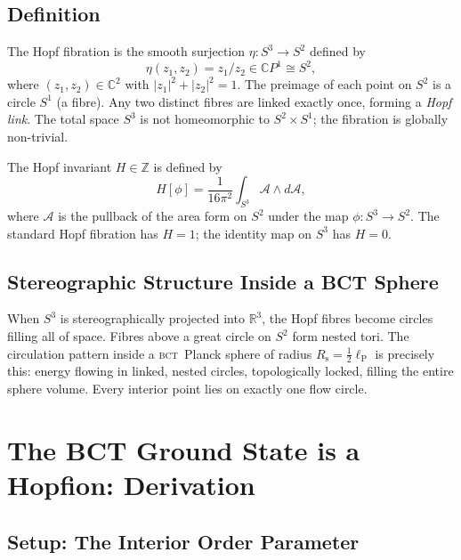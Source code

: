 \documentclass[aps,prl,preprint,superscriptaddress,floatfix]{revtex4-2}
\newcommand{\lP}{\ell_{\mathrm{P}}}
\newcommand{\BCT}{\textsc{bct}}
\newcommand{\Rsph}{R_{\mathrm{s}}}
\newcommand{\HopfN}{H}
\begin{document}
\subsection{Definition}

The Hopf fibration is the smooth surjection
$\eta: S^3\to S^2$ defined by
\begin{equation}
  \eta(z_1,z_2) = z_1/z_2 \in \mathbb{C}P^1 \cong S^2,
  \label{eq:hopf-map}
\end{equation}
where $(z_1,z_2)\in\mathbb{C}^2$ with $|z_1|^2+|z_2|^2=1$.
The preimage of each point on $S^2$ is a circle $S^1$ (a fibre).
Any two distinct fibres are linked exactly once, forming a \emph{Hopf link}.
The total space $S^3$ is not homeomorphic to $S^2\times S^1$; the
fibration is globally non-trivial.

The Hopf invariant $\HopfN\in\mathbb{Z}$ is defined by
\begin{equation}
  \HopfN[\phi] = \frac{1}{16\pi^2}
  \int_{S^3} \mathcal{A}\wedge d\mathcal{A},
  \label{eq:hopf-invariant}
\end{equation}
where $\mathcal{A}$ is the pullback of the area form on $S^2$ under the
map $\phi:S^3\to S^2$.
The standard Hopf fibration has $\HopfN=1$; the identity map on $S^3$
has $\HopfN=0$.

\subsection{Stereographic Structure Inside a BCT Sphere}

When $S^3$ is stereographically projected into $\mathbb{R}^3$, the
Hopf fibres become circles filling all of space.
Fibres above a great circle on $S^2$ form nested tori.
The circulation pattern inside a \BCT\ Planck sphere of radius
$\Rsph = \tfrac{1}{2}\lP$ is precisely this: energy flowing in linked,
nested circles, topologically locked, filling the entire sphere volume.
Every interior point lies on exactly one flow circle.

\section{The BCT Ground State is a Hopfion: Derivation}
\label{sec:derivation}

\subsection{Setup: The Interior Order Parameter}
\end{document}
